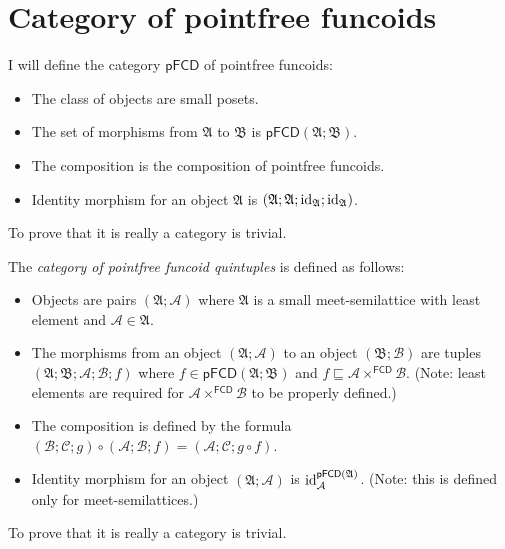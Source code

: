 \section{Category of pointfree funcoids}

I will define the category
$\mathsf{pFCD}$ of pointfree funcoids:
\begin{itemize}
\item The class of objects are small posets.
\item The set of morphisms from $\mathfrak{A}$ to $\mathfrak{B}$ is $\mathsf{pFCD}(\mathfrak{A};\mathfrak{B})$.
\item The composition is the composition of pointfree funcoids.
\item Identity morphism for an object $\mathfrak{A}$ is $(\mathfrak{A};\mathfrak{A};\operatorname{id}_{\mathfrak{A}};\operatorname{id}_{\mathfrak{A}})$.
\end{itemize}
To prove that it is really a category is trivial.

The \emph{category of
pointfree funcoid quintuples} is defined as follows:
\begin{itemize}
\item Objects are pairs $(\mathfrak{A};\mathcal{A})$ where $\mathfrak{A}$
is a small meet-semilattice with least element and $\mathcal{A}\in\mathfrak{A}$.
\item The morphisms from an object $(\mathfrak{A};\mathcal{A})$ to an object
$(\mathfrak{B};\mathcal{B})$ are tuples $(\mathfrak{A};\mathfrak{B};\mathcal{A};\mathcal{B};f)$
where $f\in\mathsf{pFCD}(\mathfrak{A};\mathfrak{B})$ and $f\sqsubseteq\mathcal{A}\times^{\mathsf{FCD}}\mathcal{B}$.
(Note: least elements are required for $\mathcal{A}\times^{\mathsf{FCD}}\mathcal{B}$
to be properly defined.)
\item The composition is defined by the formula $(\mathcal{B};\mathcal{C};g)\circ(\mathcal{A};\mathcal{B};f)=(\mathcal{A};\mathcal{C};g\circ f)$.
\item Identity morphism for an object $(\mathfrak{A};\mathcal{A})$ is $\operatorname{id}_{\mathcal{A}}^{\mathsf{pFCD}(\mathfrak{A})}$.
(Note: this is defined only for meet-semilattices.)
\end{itemize}
To prove that it is really a category is trivial.


